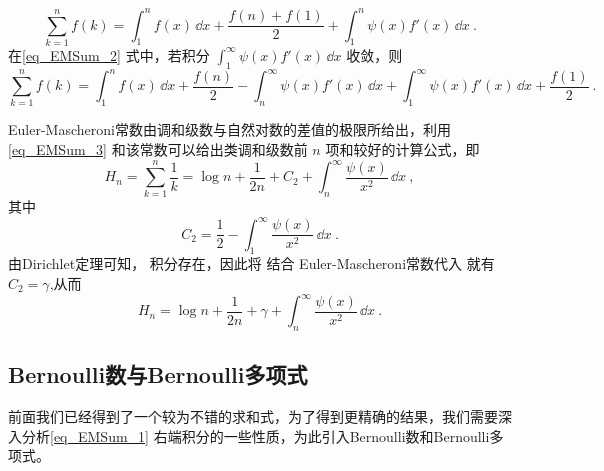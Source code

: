 \begin{equation}\label{eq_EMSum_2}
    \sum_{k=1}^{n}f(k)
    =\int_{1}^{n}f(x)\,\dd x+\frac{f(n)+f(1)}{2}+\int_{1}^{n}\psi(x)f'(x)\,\dd x~.
\end{equation}
在\autoref{eq_EMSum_2}  式中，若积分 $\displaystyle{\int_{1}^{\infty}\psi(x)f'(x)\,\dd x}$ 收敛，则
\begin{equation}\label{eq_EMSum_3}
    \sum_{k=1}^{n}f(k)=\int_{1}^{n}f(x)\,\dd x
    +\frac{f(n)}{2}-\int_{n}^{\infty}\psi(x)f'(x)\,\dd x
    +\int_{1}^{\infty}\psi(x)f'(x)\,\dd x+\frac{f(1)}{2}~.
\end{equation}
\begin{example}{}
Euler-Mascheroni常数由调和级数与自然对数的差值的极限所给出，利用\autoref{eq_EMSum_3} 和该常数可以给出类调和级数前 $n$ 项和较好的计算公式，即
\begin{equation}
    H_{n}=\sum_{k=1}^{n}\frac{1}{k}=\log n+\frac{1}{2n}+C_{2}
    +\int_{n}^{\infty}\frac{\psi(x)}{x^2}\,\dd x~,
\end{equation}
其中
\begin{equation}
    C_{2}=\frac{1}{2}-\int_{1}^{\infty}\frac{\psi(x)}{x^2}\,\dd x~.
\end{equation}
由Dirichlet定理可知， 积分存在，因此将 结合
Euler-Mascheroni常数代入 就有 $C_{2}=\gamma$,从而
\begin{equation}
    H_{n}=\log n+\frac{1}{2n}+\gamma+\int_{n}^{\infty}\frac{\psi(x)}{x^2}\,\dd x~.
\end{equation}
\end{example}

\subsection{Bernoulli数与Bernoulli多项式}

前面我们已经得到了一个较为不错的求和式，为了得到更精确的结果，我们需要深入分析\autoref{eq_EMSum_1} 右端积分的一些性质，为此引入Bernoulli数和Bernoulli多项式。


